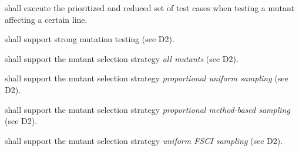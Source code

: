 \RQ{} \FAQAS shall execute the prioritized and reduced set of test cases when testing a mutant affecting a certain line.







\RQ{} \FAQAS shall support strong mutation testing (see D2).

\RQ{} \FAQAS shall support the mutant selection strategy \textit{all mutants} (see D2).

\RQ{} \FAQAS shall support the mutant selection strategy \textit{proportional uniform sampling} (see D2).

\RQ{} \FAQAS shall support the mutant selection strategy \textit{proportional method-based sampling} (see D2).

\RQ{} \FAQAS shall support the mutant selection strategy \textit{uniform FSCI sampling} (see D2).



